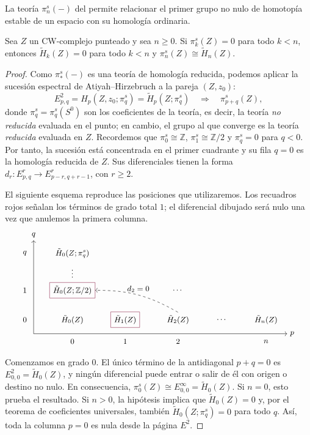 La teoría $\pi_n^s(-)$ del  permite relacionar el primer grupo no nulo de homotopía estable de un espacio con su homología ordinaria.

\begin{teo}\label{teo:hurewicz}
Sea $Z$ un CW-complejo punteado y sea $n\ge0$. Si $\pi_k^s(Z)=0$ para todo $k<n$, entonces $\tilde H_k(Z)=0$ para todo $k<n$ y $\pi_n^s(Z)\cong\tilde H_n(Z)$.
\end{teo}

\begin{proof}
Como $\pi_*^s(-)$ es una teoría de homología reducida, podemos aplicar la sucesión espectral de Atiyah--Hirzebruch a la pareja $(Z,z_0)$:
\[
E^2_{p,q}=H_p(Z,z_0;\pi_q^s)=\tilde H_p(Z;\pi_q^s)
\quad\Longrightarrow\quad\pi_{p+q}^s(Z),
\]
donde $\pi_q^s=\pi_q^s(S^0)$ son los coeficientes de la teoría, es decir, la teoría \emph{no reducida} evaluada en el punto; en cambio, el grupo al que converge es la teoría \emph{reducida} evaluada en $Z$. Recordemos que $\pi_0^s\cong\mathbb Z$, $\pi_1^s\cong\mathbb Z/2$ y $\pi_q^s=0$ para $q<0$. Por tanto, la sucesión está concentrada en el primer cuadrante y su fila $q=0$ es la homología reducida de $Z$. Sus diferenciales tienen la forma $d_r\colon E^r_{p,q}\to E^r_{p-r,q+r-1}$, con $r\ge2$.

El siguiente esquema reproduce las posiciones que utilizaremos. Los recuadros rojos señalan los términos de grado total $1$; el diferencial dibujado será nulo una vez que anulemos la primera columna.
\[
\begin{tikzpicture}[x=1.45cm,y=1.05cm,every node/.style={font=\small}]
    \draw[->] (-1.1,-.55) -- (6.1,-.55) node[right] {$p$};
    \draw[->] (-1.1,-.55) -- (-1.1,3.1) node[above] {$q$};
    \node at (-1.35,0) {$0$};
    \node at (-1.35,1.15) {$1$};
    \node at (-1.35,2.6) {$q$};
    \node at (0,-.85) {$0$};
    \node at (1.5,-.85) {$1$};
    \node at (3,-.85) {$2$};
    \node at (5.5,-.85) {$n$};
    \node (h00) at (0,0) {$\tilde H_0(Z)$};
    \node[draw=rojoDiagramaCIMAT,inner sep=4pt] (h10) at (1.5,0) {$\tilde H_1(Z)$};
    \node (h20) at (3,0) {$\tilde H_2(Z)$};
    \node at (4.25,0) {$\cdots$};
    \node at (5.5,0) {$\tilde H_n(Z)$};
    \node[draw=rojoDiagramaCIMAT,inner sep=4pt] (h01) at (0,1.15) {$\tilde H_0(Z;\mathbb Z/2)$};
    \node at (3,1.15) {$\cdots$};
    \node at (0,1.9) {$\vdots$};
    \node at (0,2.6) {$\tilde H_0(Z;\pi_q^s)$};
    \draw[->,dashed] (h20.north) to[bend right=15]
        node[above] {$d_2=0$} (h01.east);
\end{tikzpicture}
\]
Comenzamos en grado $0$. El único término de la antidiagonal $p+q=0$ es $E^2_{0,0}=\tilde H_0(Z)$, y ningún diferencial puede entrar o salir de él con origen o destino no nulo. En consecuencia, $\pi_0^s(Z)\cong E^\infty_{0,0}=\tilde H_0(Z)$. Si $n=0$, esto prueba el resultado. Si $n>0$, la hipótesis implica que $\tilde H_0(Z)=0$ y, por el teorema de coeficientes universales, también $\tilde H_0(Z;\pi_q^s)=0$ para todo $q$. Así, toda la columna $p=0$ es nula desde la página $E^2$.


\end{proof}
